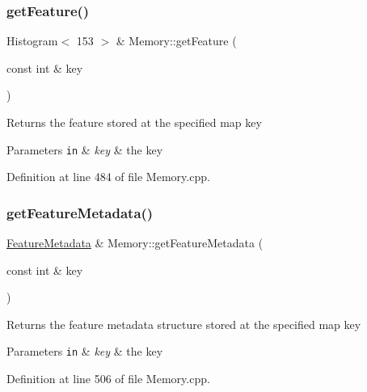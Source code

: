 \mbox{\label{class_memory_abdfd86649f7e608ae6ea6af54e192fe6}} 
\subsubsection{\texorpdfstring{get\+Feature()}{getFeature()}}
{\footnotesize\ttfamily Histogram$<$ 153 $>$ \& Memory\+::get\+Feature (\begin{DoxyParamCaption}\item[{const int \&}]{key }\end{DoxyParamCaption})}

Returns the feature stored at the specified map key


\begin{DoxyParams}[1]{Parameters}
\mbox{\tt in}  & {\em key} & the key \\
\hline
\end{DoxyParams}


Definition at line 484 of file Memory.\+cpp.

\mbox{\label{class_memory_a31661ea1c1d5a5fd22c0168541e82e3a}} 
\subsubsection{\texorpdfstring{get\+Feature\+Metadata()}{getFeatureMetadata()}}
{\footnotesize\ttfamily \hyperlink{class_feature_metadata}{Feature\+Metadata} \& Memory\+::get\+Feature\+Metadata (\begin{DoxyParamCaption}\item[{const int \&}]{key }\end{DoxyParamCaption})}

Returns the feature metadata structure stored at the specified map key


\begin{DoxyParams}[1]{Parameters}
\mbox{\tt in}  & {\em key} & the key \\
\hline
\end{DoxyParams}


Definition at line 506 of file Memory.\+cpp.

\mbox{\label{class_memory_ac57d713e84dce226545c1bd13007084b}} 
